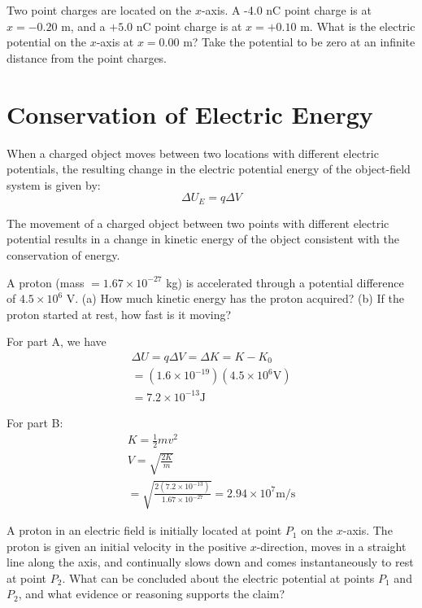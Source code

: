 \documentclass[../em.tex]{subfiles}
\begin{document}
\ex Two point charges are located on the $x$-axis. A -4.0 nC point charge is at $x=-0.20$ m, and a $+5.0$ nC point charge is at $x=+0.10$ m. What is the electric potential on the $x$-axis at $x=0.00$ m? Take the potential to be zero at an infinite distance from the point charges.

\section{Conservation of Electric Energy}
When a charged object moves between two locations with different electric potentials, the resulting change in the electric potential energy
of the object-field system is given by:
\[\Delta U_E=q\Delta V\]

The movement of a charged object between two points with different electric potential results in a change in kinetic
energy of the object consistent with the conservation of energy.

\pagebreak
\begin{example}
    A proton (mass $=1.67\times10^{-27}$ kg) is accelerated through a potential difference of $4.5\times10^6$ V.
    (a) How much kinetic energy has the proton acquired? (b) If the proton started at rest, how fast is it moving?

    For part A, we have
    \begin{align*}
    \Delta U = q\Delta V = \Delta K = K-K_0 \\
    = (1.6\times10^{-19})(4.5\times10^6\text{V})\\
    = 7.2\times10^{-13}\text{J}
    \end{align*}

    For part B:
    \begin{align*}
        K = \frac{1}{2}mv^2\\
        V = \sqrt{\frac{2K}{m}}\\
        = \sqrt{\frac{2(7.2\times10^{-13})}{1.67\times10^{-27}}}=2.94\times10^7\text{m/s}
    \end{align*}
    
\end{example}
\ex A proton in an electric field is initially located at point $P_1$ on the $x$-axis. The proton is given an initial velocity in the positive $x$-direction, moves in a straight line along the axis, and 
continually slows down and comes instantaneously to rest at point $P_2$. What can be concluded about the electric potential at points $P_1$ and $P_2$, and what evidence or reasoning supports the claim?
\end{document}
